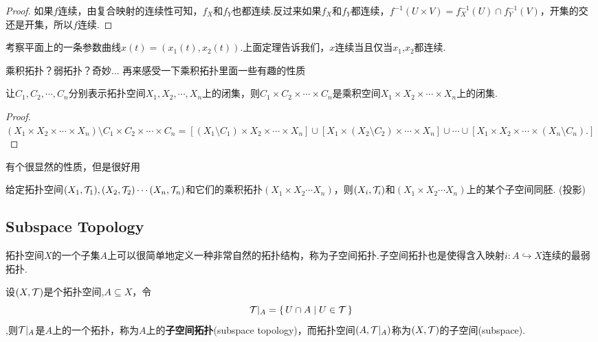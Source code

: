 \begin{proof}
如果$f$连续，由复合映射的连续性可知，$f_X$和$f_Y$也都连续.反过来如果$f_X$和$f_Y$都连续，$f^{-1}(U \times V)=f_X^{-1}(U) \cap f_Y^{-1}(V)$，开集的交还是开集，所以$f$连续.
\end{proof}

\begin{example}
考察平面上的一条参数曲线$x(t)=(x_1(t),x_2(t))$.上面定理告诉我们，$x$连续当且仅当$x_1$,$x_2$都连续.
\end{example}

乘积拓扑？弱拓扑？奇妙... 再来感受一下乘积拓扑里面一些有趣的性质

\begin{proposition}
让$C_1,C_2,\cdots,C_n$分别表示拓扑空间$X_1,X_2,\cdots,X_n$上的闭集，则$C_1 \times C_2 \times \cdots \times C_n$是乘积空间$X_1 \times X_2 \times \cdots \times X_n$上的闭集.
\end{proposition}

\begin{proof}
$(X_1 \times X_2 \times \cdots \times X_n) \setminus C_1 \times C_2 \times \cdots \times C_n = [(X_1\setminus C_1) \times X_2 \times \cdots \times X_n] \cup [X_1 \times (X_2\setminus C_2) \times \cdots \times X_n] \cup \cdots \cup [X_1 \times X_2 \times \cdots \times (X_n\setminus C_n).]$ 
\end{proof}

有个很显然的性质，但是很好用
\begin{proposition}
给定拓扑空间$(X_1,\mathcal{T}_1),(X_2,\mathcal{T}_2)\cdots(X_n,\mathcal{T}_n)$和它们的乘积拓扑$(X_1 \times X_2 \cdots X_n)$，则$(X_i,\mathcal{T}_i)$和$(X_1 \times X_2 \cdots X_n)$上的某个子空间同胚. (投影)
\end{proposition}



\newpage
\subsection{Subspace Topology}

拓扑空间$X$的一个子集$A$上可以很简单地定义一种非常自然的拓扑结构，称为子空间拓扑.子空间拓扑也是使得含入映射$i \colon A \hookrightarrow X$连续的最弱拓扑.

\begin{definition}
设$(X,\mathcal{T})$是个拓扑空间,$A \subseteq X$，令\[\mathcal{T}|_A=\{\,U \cap A\mid U \in \mathcal{T}\,\}\],则$\mathcal{T}|_A$是$A$上的一个拓扑，称为$A$上的\textbf{子空间拓扑}(subspace topology)，而拓扑空间$(A,\mathcal{T}|_A)$称为$(X,\mathcal{T})$的子空间(subspace).
\end{definition}

